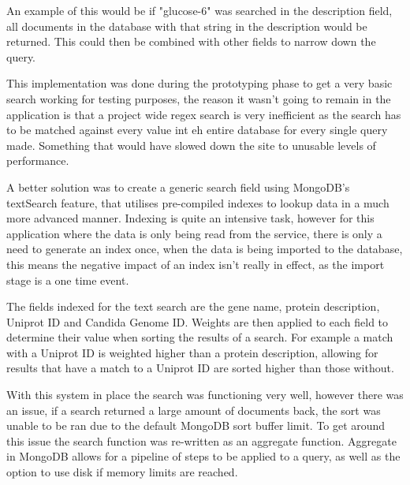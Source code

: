 {An example of this would be if "glucose-6" was searched in the description field, all documents in the database with that string in the description would be returned. This could then be combined with other fields to narrow down the query. 

This implementation was done during the prototyping phase to get a very basic search working for testing purposes, the reason it wasn't going to remain in the application is that a project wide regex search is very inefficient as the search has to be matched against every value int eh entire database for every single query made. Something that would have slowed down the site to unusable levels of performance.

A better solution was to create a generic search field using MongoDB's textSearch\cite{textsearch} feature, that utilises pre-compiled indexes to lookup data in a much more advanced manner. Indexing is quite an intensive task, however for this application where the data is only being read from the service, there is only a need to generate an index once, when the data is being imported to the database, this means the negative impact of an index isn't really in effect, as the import stage is a one time event. 

The fields indexed for the text search are the gene name, protein description, Uniprot ID and Candida Genome ID. Weights are then applied to each field to determine their value when sorting the results of a search. For example a match with a Uniprot ID is weighted higher than a protein description, allowing for results that have a match to a Uniprot ID are sorted higher than those without.  

With this system in place the search was functioning very well, however there was an issue, if a search returned a large amount of documents back, the sort was unable to be ran due to the default MongoDB sort buffer limit. To get around this issue the search function was re-written as an aggregate function. Aggregate\cite{aggregate} in MongoDB allows for a pipeline of steps to be applied to a query, as well as the option to use disk if memory limits are reached. 


% 
% 
% 

}
